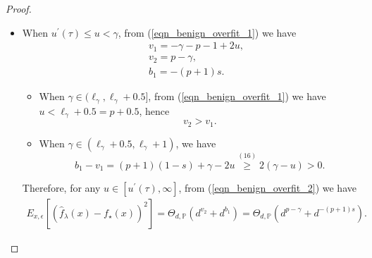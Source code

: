 \documentclass{article}
\theoremstyle{plain}
\theoremstyle{definition}
\theoremstyle{remark}
\newcommand{\dhcom}[2]{{\color{cyan}#1}{\color{red}[#2]} }%
\begin{document}
\begin{appendix}
\begin{proof}
\begin{itemize}

\item When $u^{\prime}(\tau) \leq u < \gamma$, from (\ref{eqn_benign_overfit_1}) we have
    \begin{equation*}
    \begin{aligned}
    &~v_1 =  -\gamma - p - 1 +2u,\\
    &~v_2 =   p - \gamma,\\
    &~b_1 =  -(p + 1)  s.
    \end{aligned}
\end{equation*}
\begin{itemize}

    \item When $\gamma \in (\ell_{\gamma}, \ell_{\gamma}+0.5]$, from (\ref{eqn_benign_overfit_1}) we have $u<\ell_{\gamma}+0.5=p+0.5$, hence
    $$
    v_2 > v_1.
    $$

    \item When $\gamma \in (\ell_{\gamma}+0.5, \ell_{\gamma}+1)$, we have
    $$
    b_1 - v_1 = (p+1)(1-s) + \gamma - 2u \overset{(16)}{\geq} 2(\gamma - u)>0.
    $$

\end{itemize}
Therefore, for any $u \in [u^{\prime}(\tau), \infty]$, from (\ref{eqn_benign_overfit_2}) we have
\begin{equation*}
\begin{aligned}
    E_{x, \epsilon} \left[ \left(\hat{f}_{\lambda}(x) - f_{\star}(x) \right)^{2} \right]
= \Theta_{d, \mathbb{P}} \left( d^{v_2} + d^{b_1}\right) = \Theta_{d, \mathbb{P}} \left( 
d^{p-\gamma} + 
    d^{-(p+1)s}
\right).
\end{aligned}
\end{equation*}
\end{itemize}






\end{proof}
\end{appendix}
\end{document}
